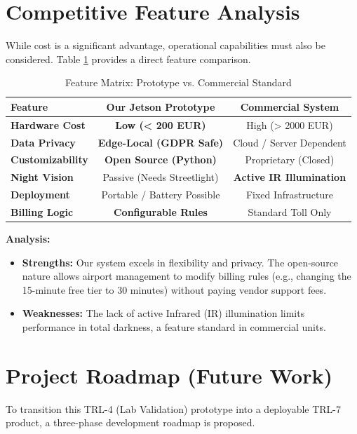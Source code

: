 \section{Competitive Feature Analysis}
While cost is a significant advantage, operational capabilities must also be considered. Table \ref{tab:competitor_matrix} provides a direct feature comparison.

\begin{table}[H]
	\centering
	\caption{Feature Matrix: Prototype vs. Commercial Standard}
	\label{tab:competitor_matrix}
	\renewcommand{\arraystretch}{1.4}
	\begin{tabular}{|l|c|c|}
		\hline
		\textbf{Feature} & \textbf{Our Jetson Prototype} & \textbf{Commercial System} \\ \hline
		\textbf{Hardware Cost} & \textbf{Low (< 200 EUR)} & High (> 2000 EUR) \\ \hline
		\textbf{Data Privacy} & \textbf{Edge-Local (GDPR Safe)} & Cloud / Server Dependent \\ \hline
		\textbf{Customizability} & \textbf{Open Source (Python)} & Proprietary (Closed) \\ \hline
		\textbf{Night Vision} & Passive (Needs Streetlight) & \textbf{Active IR Illumination} \\ \hline
		\textbf{Deployment} & Portable / Battery Possible & Fixed Infrastructure \\ \hline
		\textbf{Billing Logic} & \textbf{Configurable Rules} & Standard Toll Only \\ \hline
	\end{tabular}
\end{table}

\textbf{Analysis:}
\begin{itemize}
	\item \textbf{Strengths:} Our system excels in flexibility and privacy. The open-source nature allows airport management to modify billing rules (e.g., changing the 15-minute free tier to 30 minutes) without paying vendor support fees.
	\item \textbf{Weaknesses:} The lack of active Infrared (IR) illumination limits performance in total darkness, a feature standard in commercial units.
\end{itemize}

\section{Project Roadmap (Future Work)}
To transition this TRL-4 (Lab Validation) prototype into a deployable TRL-7 product, a three-phase development roadmap is proposed.

